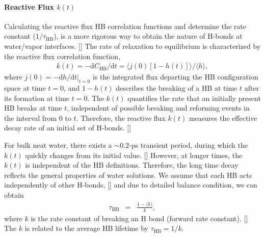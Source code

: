 \paragraph{Reactive Flux $k(t)$} 
Calculating the reactive flux HB correlation functions and determine the rate constant ($1/\tau_{\text{HB}}$), is a more rigorous way to obtain the nature of H-bonds at water/vapor interfaces. [\cite{AL00}]
The rate of relaxation to equilibrium is characterized by the reactive flux correlation function, 
\begin{eqnarray}
k(t) = -\text{d}C_{\text{HB}}/\text{d}t=\langle j(0)[1-h(t)]\rangle/\langle h\rangle,
\label{eq:k}
\end{eqnarray}
where 
$j(0)=-\text{d}h/\text{d}t|_{t=0}$ 
is the integrated flux departing the HB configuration space at time $t=0$, and
$1-h(t)$ describes the breaking of a HB at time $t$ after its formation at time $t=0$.
The $k(t)$ quantifies the rate that an initially present HB breaks at time $t$, 
independent of possible breaking and reforming events in the interval from 0 to $t$.
Therefore, the reactive flux $k(t)$ measures the effective decay rate of an 
initial set of H-bonds. [\cite{FWS00, DC87}]

For bulk neat water, there exists a $\sim 0.2$-ps transient period,
during which the $k(t)$ quickly changes from its initial value. [\cite{FWS00}]
However, at longer times, the $k(t)$ is independent of the HB definitions.
Therefore, the long time decay reflects the general properties of water solutions.
We assume that each HB acts independently of other H-bonds, [\cite{AL96,AL00}] 
and due to detailed balance condition, we can obtain 
\begin{eqnarray}
  \tau_{\text{HB}} &=& \frac{1- \langle h\rangle}{k},
\label{eq:rate}
\end{eqnarray}
where $k$ is the rate constant of breaking an H bond (forward rate constant). [\cite{Chandler1978,Chandler1986}] 
The $k$ is related to the average HB lifetime by $\tau_{\text{HB}}=1/k$.



